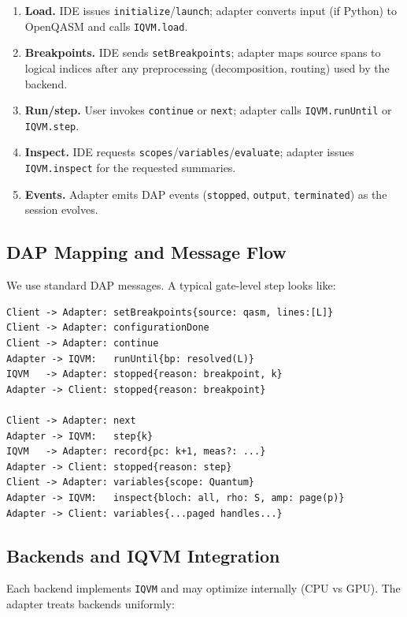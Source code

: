 \documentclass[12pt]{article}
\begin{document}
\begin{enumerate}
  \item \textbf{Load.} IDE issues \texttt{initialize}/\texttt{launch}; adapter converts input (if Python) to OpenQASM and calls \texttt{IQVM.load}.
  \item \textbf{Breakpoints.} IDE sends \texttt{setBreakpoints}; adapter maps source spans to logical indices after any preprocessing (decomposition, routing) used by the backend.
  \item \textbf{Run/step.} User invokes \texttt{continue} or \texttt{next}; adapter calls \texttt{IQVM.runUntil} or \texttt{IQVM.step}.
  \item \textbf{Inspect.} IDE requests \texttt{scopes}/\texttt{variables}/\texttt{evaluate}; adapter issues \texttt{IQVM.inspect} for the requested summaries.
  \item \textbf{Events.} Adapter emits DAP events (\texttt{stopped}, \texttt{output}, \texttt{terminated}) as the session evolves.
\end{enumerate}

\subsection{DAP Mapping and Message Flow}

We use standard DAP messages. A typical gate-level step looks like:

\begin{lstlisting}[basicstyle=\ttfamily\small]
Client -> Adapter: setBreakpoints{source: qasm, lines:[L]}
Client -> Adapter: configurationDone
Client -> Adapter: continue
Adapter -> IQVM:   runUntil{bp: resolved(L)}
IQVM   -> Adapter: stopped{reason: breakpoint, k}
Adapter -> Client: stopped{reason: breakpoint}

Client -> Adapter: next
Adapter -> IQVM:   step{k}
IQVM   -> Adapter: record{pc: k+1, meas?: ...}
Adapter -> Client: stopped{reason: step}
Client -> Adapter: variables{scope: Quantum}
Adapter -> IQVM:   inspect{bloch: all, rho: S, amp: page(p)}
Adapter -> Client: variables{...paged handles...}
\end{lstlisting}


\subsection{Backends and IQVM Integration}

Each backend implements \texttt{IQVM} and may optimize internally (CPU vs GPU). The adapter treats backends uniformly:
\end{document}
